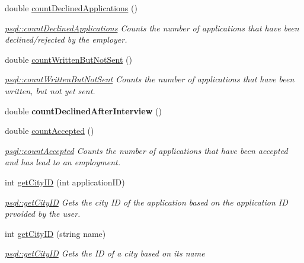 \begin{DoxyCompactItemize}
double \mbox{\hyperlink{classpsql_a40541367c3af9c0ac94e2fb92f00f53c}{count\+Declined\+Applications}} ()
\begin{DoxyCompactList}\small\item\em \mbox{\hyperlink{classpsql_a40541367c3af9c0ac94e2fb92f00f53c}{psql\+::count\+Declined\+Applications}} Counts the number of applications that have been declined/rejected by the employer. \end{DoxyCompactList}\item 
double \mbox{\hyperlink{classpsql_a70ad9f4b00735a55232f46da4edd2edc}{count\+Written\+But\+Not\+Sent}} ()
\begin{DoxyCompactList}\small\item\em \mbox{\hyperlink{classpsql_a70ad9f4b00735a55232f46da4edd2edc}{psql\+::count\+Written\+But\+Not\+Sent}} Counts the number of applications that have been written, but not yet sent. \end{DoxyCompactList}\item 
\mbox{\label{classpsql_a2ae512bc231446d5fccae84582395675}} 
double {\bfseries count\+Declined\+After\+Interview} ()
\item 
double \mbox{\hyperlink{classpsql_a0beec2f098edc0961f27774cdd54d09b}{count\+Accepted}} ()
\begin{DoxyCompactList}\small\item\em \mbox{\hyperlink{classpsql_a0beec2f098edc0961f27774cdd54d09b}{psql\+::count\+Accepted}} Counts the number of applications that have been accepted and has lead to an employment. \end{DoxyCompactList}\item 
int \mbox{\hyperlink{classpsql_af3462a12dc106e0ca8df4fa8fcf28436}{get\+City\+ID}} (int application\+ID)
\begin{DoxyCompactList}\small\item\em \mbox{\hyperlink{classpsql_af3462a12dc106e0ca8df4fa8fcf28436}{psql\+::get\+City\+ID}} Gets the city ID of the application based on the application ID prvoided by the user. \end{DoxyCompactList}\item 
int \mbox{\hyperlink{classpsql_a0c33b3f48064ba75abaa4b0b58eb1ccd}{get\+City\+ID}} (string name)
\begin{DoxyCompactList}\small\item\em \mbox{\hyperlink{classpsql_af3462a12dc106e0ca8df4fa8fcf28436}{psql\+::get\+City\+ID}} Gets the ID of a city based on its name \end{DoxyCompactList}\item 

\end{DoxyCompactItemize}
